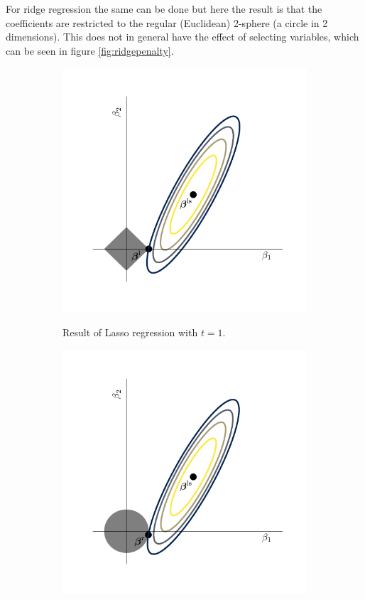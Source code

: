 \documentclass[a4paper, 12pt]{scrartcl}
\begin{document}
For ridge regression the same can be done but here the result is that the coefficients are restricted to the regular (Euclidean) 2-sphere (a circle in 2 dimensions).
This does not in general have the effect of selecting variables, which can be seen in figure \ref{fig:ridgepenalty}.

\begin{figure}[hb]
	\begin{subfigure}{.5\textwidth}
		\centering
		\includegraphics[width=.8\linewidth, clip, trim={10mm 10mm 10mm 10mm}]{Figure1.pdf}
		\label{fig:lassopenalty}
		\caption{Result of Lasso regression with $t=1$.}
	\end{subfigure}
	\begin{subfigure}{.5\textwidth}
		\centering
		\includegraphics[width=.8\linewidth, clip, trim={10mm 10mm 10mm 10mm}]{Figure2.pdf}

\end{subfigure}
\end{figure}
\end{document}
